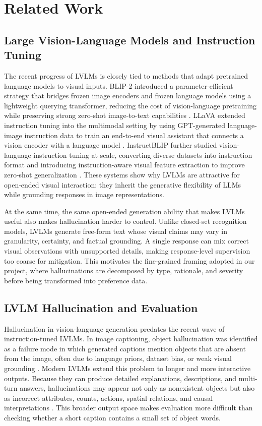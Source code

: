 \documentclass{article}
\begin{document}
\section{Related Work}

\subsection{Large Vision-Language Models and Instruction Tuning}

The recent progress of LVLMs is closely tied to methods that adapt pretrained language models to visual inputs. BLIP-2 introduced a parameter-efficient strategy that bridges frozen image encoders and frozen language models using a lightweight querying transformer, reducing the cost of vision-language pretraining while preserving strong zero-shot image-to-text capabilities \citep{li2023blip2}. LLaVA extended instruction tuning into the multimodal setting by using GPT-generated language-image instruction data to train an end-to-end visual assistant that connects a vision encoder with a language model \citep{liu2023visual}. InstructBLIP further studied vision-language instruction tuning at scale, converting diverse datasets into instruction format and introducing instruction-aware visual feature extraction to improve zero-shot generalization \citep{dai2023instructblip}. These systems show why LVLMs are attractive for open-ended visual interaction: they inherit the generative flexibility of LLMs while grounding responses in image representations.

At the same time, the same open-ended generation ability that makes LVLMs useful also makes hallucination harder to control. Unlike closed-set recognition models, LVLMs generate free-form text whose visual claims may vary in granularity, certainty, and factual grounding. A single response can mix correct visual observations with unsupported details, making response-level supervision too coarse for mitigation. This motivates the fine-grained framing adopted in our project, where hallucinations are decomposed by type, rationale, and severity before being transformed into preference data.

\subsection{LVLM Hallucination and Evaluation}

Hallucination in vision-language generation predates the recent wave of instruction-tuned LVLMs. In image captioning, object hallucination was identified as a failure mode in which generated captions mention objects that are absent from the image, often due to language priors, dataset bias, or weak visual grounding \citep{rohrbach2018object}. Modern LVLMs extend this problem to longer and more interactive outputs. Because they can produce detailed explanations, descriptions, and multi-turn answers, hallucinations may appear not only as nonexistent objects but also as incorrect attributes, counts, actions, spatial relations, and causal interpretations \citep{liu2024survey}. This broader output space makes evaluation more difficult than checking whether a short caption contains a small set of object words.
\end{document}
